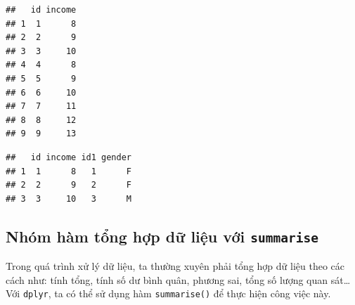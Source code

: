 \documentclass[]{krantz}
\makeatletter
\newenvironment{Shaded}{\begin{snugshade}}{\end{snugshade}}
\newcommand{\CommentTok}[1]{\textcolor[rgb]{0.37,0.37,0.37}{\textit{#1}}}
\newcommand{\DataTypeTok}[1]{\textcolor[rgb]{0.27,0.27,0.27}{#1}}
\newcommand{\DecValTok}[1]{\textcolor[rgb]{0.06,0.06,0.06}{#1}}
\newcommand{\KeywordTok}[1]{\textcolor[rgb]{0.27,0.27,0.27}{\textbf{#1}}}
\newcommand{\NormalTok}[1]{#1}
\newcommand{\OperatorTok}[1]{\textcolor[rgb]{0.43,0.43,0.43}{\textbf{#1}}}
\newcommand{\StringTok}[1]{\textcolor[rgb]{0.5,0.5,0.5}{#1}}
\newenvironment{kframe}{%
\medskip{}
\setlength{\fboxsep}{.8em}
 \def\at@end@of@kframe{}%
 \ifinner\ifhmode%
  \def\at@end@of@kframe{\end{minipage}}%
  \begin{minipage}{\columnwidth}%
 \fi\fi%
 \def\FrameCommand##1{\hskip\@totalleftmargin \hskip-\fboxsep
 \colorbox{shadecolor}{##1}\hskip-\fboxsep
     \hskip-\linewidth \hskip-\@totalleftmargin \hskip\columnwidth}%
 \MakeFramed {\advance\hsize-\width
   \@totalleftmargin\z@ \linewidth\hsize
   \@setminipage}}%
 {\par\unskip\endMakeFramed%
 \at@end@of@kframe}
\renewenvironment{Shaded}{\begin{kframe}}{\end{kframe}}
\renewenvironment{Shaded}{\begin{snugshade}}{\end{snugshade}}
\renewcommand{\CommentTok}[1]{\textcolor[rgb]{0.56,0.35,0.01}{\textit{#1}}}
\renewcommand{\DataTypeTok}[1]{\textcolor[rgb]{0.13,0.29,0.53}{#1}}
\renewcommand{\DecValTok}[1]{\textcolor[rgb]{0.00,0.00,0.81}{#1}}
\renewcommand{\KeywordTok}[1]{\textcolor[rgb]{0.13,0.29,0.53}{\textbf{#1}}}
\renewcommand{\NormalTok}[1]{#1}
\renewcommand{\OperatorTok}[1]{\textcolor[rgb]{0.81,0.36,0.00}{\textbf{#1}}}
\renewcommand{\StringTok}[1]{\textcolor[rgb]{0.31,0.60,0.02}{#1}}
\theoremstyle{definition}
\theoremstyle{definition}
\theoremstyle{definition}
\theoremstyle{remark}
\makeatother
\begin{document}
\begin{Shaded}
\end{Shaded}

\begin{verbatim}
##   id income
## 1  1      8
## 2  2      9
## 3  3     10
## 4  4      8
## 5  5      9
## 6  6     10
## 7  7     11
## 8  8     12
## 9  9     13
\end{verbatim}

\begin{Shaded}
\end{Shaded}

\begin{verbatim}
##   id income id1 gender
## 1  1      8   1      F
## 2  2      9   2      F
## 3  3     10   3      M
\end{verbatim}

\hypertarget{nhom-ham-tng-hp-d-liu-vi-summarise}{%
\subsection{\texorpdfstring{Nhóm hàm tổng hợp dữ liệu với
\texttt{summarise}}{Nhóm hàm tổng hợp dữ liệu với summarise}}\label{nhom-ham-tng-hp-d-liu-vi-summarise}}

Trong quá trình xử lý dữ liệu, ta thường xuyên phải tổng hợp dữ liệu
theo các cách như: tính tổng, tính số dư bình quân, phương sai, tổng số
lượng quan sát\ldots{} Với \texttt{dplyr}, ta có thể sử dụng hàm
\texttt{summarise()} để thực hiện công việc này.
\end{document}
